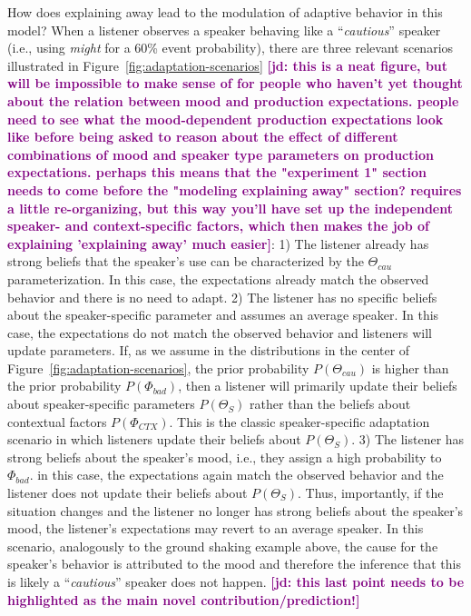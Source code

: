 \documentclass[man,floatsintext]{apa6}
\newcommand{\jd}[1]{\textcolor{Purple}{\bf [jd: #1]}}
\begin{document}
How does explaining away lead to the modulation of adaptive behavior in this model? When a listener observes a speaker behaving like a ``\textit{cautious}'' speaker (i.e., using \textit{might} for a 60\% event probability), there are three relevant scenarios illustrated in Figure~\ref{fig:adaptation-scenarios} \jd{this is a neat figure, but will be impossible to make sense of for people who haven't yet thought about the relation between mood and production expectations. people need to see what the mood-dependent production expectations look like before being asked to reason  about the effect of different combinations of mood and speaker type parameters on production expectations. perhaps this means that the "experiment 1" section needs to come before the "modeling explaining away" section? requires a little re-organizing, but this way you'll have set up the independent speaker- and context-specific factors, which then makes the job of explaining 'explaining away' much easier}: 1) The listener already has strong beliefs that the speaker's use can be characterized by the $\Theta_{cau}$ parameterization. In this case, the expectations already match the observed behavior and there is no need to adapt. 2) The listener has no specific beliefs about the speaker-specific parameter and assumes an average speaker. In this case, the expectations do not match the observed behavior and listeners will update parameters. If, as we assume in the distributions in the center of Figure~\ref{fig:adaptation-scenarios}, the prior probability $P(\Theta_{cau})$  is higher than the prior probability $P(\Phi_{bad})$, then a listener will primarily update their beliefs about speaker-specific parameters $P(\Theta_S)$ rather than the beliefs about contextual factors $P(\Phi_{CTX})$. This is the classic speaker-specific adaptation scenario in which listeners update their beliefs about $P(\Theta_S)$. 3) The listener has strong beliefs about the speaker's mood, i.e., they assign a high probability to $\Phi_{bad}$. in this case, the expectations again match the observed behavior and the listener does not update their beliefs about $P(\Theta_S)$. Thus, importantly, if the situation changes and the listener no longer has strong beliefs about the speaker's mood, the listener's expectations may revert to an average speaker. In this scenario, analogously to the ground shaking example above, the cause for the speaker's behavior is attributed to the mood and therefore the inference that this is likely a ``\textit{cautious}'' speaker does not happen. \jd{this last point needs to be highlighted as the main novel contribution/prediction!}
\end{document}
